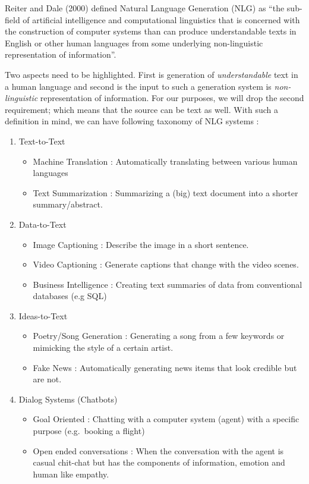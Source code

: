 \documentclass[]{krantz}
\providecommand{\tightlist}{%
  \setlength{\itemsep}{0pt}\setlength{\parskip}{0pt}}
\begin{document}
Reiter and Dale (2000) defined Natural Language Generation (NLG) as ``the sub-field of artificial intelligence and computational linguistics that is concerned with the construction of computer systems than can produce understandable texts in English or other human languages from some underlying non-linguistic representation of information''.

Two aspects need to be highlighted. First is generation of \emph{understandable} text in a human language and second is the input to such a generation system is \emph{non-linguistic} representation of information. For our purposes, we will drop the second requirement; which means that the source can be text as well. With such a definition in mind, we can have following taxonomy of NLG systems :

\begin{enumerate}
\def\labelenumi{\arabic{enumi}.}
\item
  Text-to-Text

  \begin{itemize}
  \tightlist
  \item
    Machine Translation : Automatically translating between various human languages
  \item
    Text Summarization : Summarizing a (big) text document into a shorter summary/abstract.
  \end{itemize}
\item
  Data-to-Text

  \begin{itemize}
  \tightlist
  \item
    Image Captioning : Describe the image in a short sentence.
  \item
    Video Captioning : Generate captions that change with the video scenes.
  \item
    Business Intelligence : Creating text summaries of data from conventional databases (e.g SQL)
  \end{itemize}
\item
  Ideas-to-Text

  \begin{itemize}
  \tightlist
  \item
    Poetry/Song Generation : Generating a song from a few keywords or mimicking the style of a certain artist.
  \item
    Fake News : Automatically generating news items that look credible but are not.
  \end{itemize}
\item
  Dialog Systems (Chatbots)

  \begin{itemize}
  \tightlist
  \item
    Goal Oriented : Chatting with a computer system (agent) with a specific purpose (e.g.~booking a flight)
  \item
    Open ended conversations : When the conversation with the agent is casual chit-chat but has the components of information, emotion and human like empathy.
  \end{itemize}
\end{enumerate}
\end{document}
